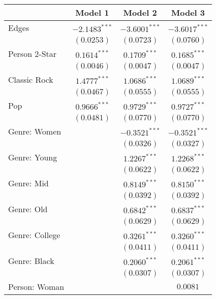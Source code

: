 
\begin{table}
\begin{center}
\begin{tabular}{l c c c}
\toprule
 & Model 1 & Model 2 & Model 3 \\
\midrule
Edges           & $-2.1483^{***}$ & $-3.6001^{***}$ & $-3.6017^{***}$ \\
                & $(0.0253)$      & $(0.0723)$      & $(0.0760)$      \\
Person 2-Star   & $0.1614^{***}$  & $0.1709^{***}$  & $0.1685^{***}$  \\
                & $(0.0046)$      & $(0.0047)$      & $(0.0047)$      \\
Classic Rock    & $1.4777^{***}$  & $1.0686^{***}$  & $1.0689^{***}$  \\
                & $(0.0467)$      & $(0.0555)$      & $(0.0555)$      \\
Pop             & $0.9666^{***}$  & $0.9729^{***}$  & $0.9727^{***}$  \\
                & $(0.0481)$      & $(0.0770)$      & $(0.0770)$      \\
Genre: Women    &                 & $-0.3521^{***}$ & $-0.3521^{***}$ \\
                &                 & $(0.0326)$      & $(0.0327)$      \\
Genre: Young    &                 & $1.2267^{***}$  & $1.2268^{***}$  \\
                &                 & $(0.0622)$      & $(0.0622)$      \\
Genre: Mid      &                 & $0.8149^{***}$  & $0.8150^{***}$  \\
                &                 & $(0.0392)$      & $(0.0392)$      \\
Genre: Old      &                 & $0.6842^{***}$  & $0.6837^{***}$  \\
                &                 & $(0.0629)$      & $(0.0629)$      \\
Genre: College  &                 & $0.3261^{***}$  & $0.3260^{***}$  \\
                &                 & $(0.0411)$      & $(0.0411)$      \\
Genre: Black    &                 & $0.2060^{***}$  & $0.2061^{***}$  \\
                &                 & $(0.0307)$      & $(0.0307)$      \\
Person: Woman   &                 &                 & $0.0081$        \\

\end{tabular}
\end{center}
\end{table}
